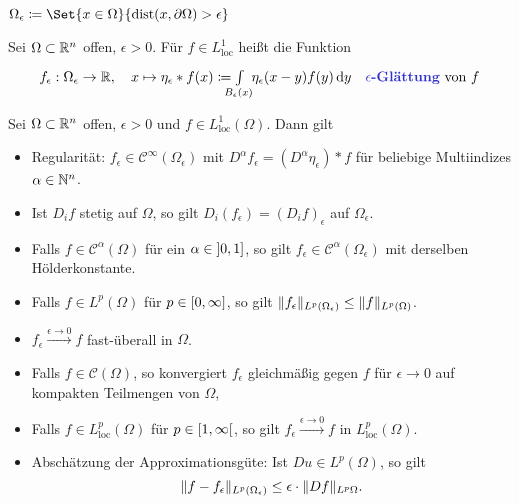\documentclass{cheat-sheet}
\newcommand{\dist}{\mathrm{dist}} %
\begin{document}
\begin{nota}
  $\Omega_{\epsilon} \coloneqq \Set{ x \in \Omega }{ \dist(x, \partial \Omega) > \epsilon }$
\end{nota}

\begin{defn}
  Sei $\Omega \subset \mathbb{R}^n$ offen, $\epsilon > 0$. Für $f \in L_{\text{loc}}^1$ heißt die Funktion
  \[
    f_\epsilon : \Omega_{\epsilon} \to \R, \quad
    x \mapsto \eta_\epsilon * f(x) \coloneqq \Int{\mathclap{B_{\epsilon}(x)}}{}{\enspace\eta_{\epsilon}(x-y) f(y)}{y}
    \quad \text{\emph{$\epsilon$-Glättung} von $f$}
  \]
\end{defn}

\begin{satz}
  Sei $\Omega \subset \mathbb{R}^n$ offen, $\epsilon > 0$ und $f \in L_{\text{loc}}^1(\Omega)$. Dann gilt
  \begin{itemize}
    \item Regularität: $f_{\epsilon} \in \mathcal{C}^\infty(\Omega_\epsilon)$ mit $D^{\alpha} f_\epsilon = (D^\alpha \eta_\epsilon) * f$ für beliebige Multiindizes $\alpha \in \mathbb{N}^n$.
    \item Ist $D_i f$ stetig auf $\Omega$, so gilt $D_i (f_\epsilon) = (D_i f)_\epsilon$ auf $\Omega_\epsilon$. %
    \item Falls $f \in \mathcal{C}^\alpha(\Omega)$ für ein $\alpha \in \left] 0, 1 \right]$, so gilt $f_\epsilon \in \mathcal{C}^\alpha(\Omega_\epsilon)$ mit derselben Hölderkonstante.
    \item Falls $f \in L^p(\Omega)$ für $p \in \left[ 0, \infty \right]$, so gilt $\lVert f_\epsilon\rVert_{L^p(\Omega_\epsilon)} \leq \lVert f\rVert_{L^p(\Omega)}$.
    \item $f_\epsilon \xrightarrow{\epsilon \to 0} f$ fast-überall in $\Omega$.
    \item Falls $f \in \mathcal{C}(\Omega)$, so konvergiert $f_\epsilon$ gleichmäßig gegen $f$ für $\epsilon \to 0$ auf kompakten Teilmengen von $\Omega$,
    \item Falls $f \in L_{\text{loc}}^p(\Omega)$ für $p \in \left[ 1, \infty \right[$, so gilt $f_\epsilon \xrightarrow{\epsilon \to 0} f$ in $L_{\text{loc}}^p(\Omega)$.
    \item Abschätzung der Approximationsgüte: Ist $Du \in L^p(\Omega)$, so gilt
    \[ \lVert f - f_\epsilon\rVert_{L^p(\Omega_\epsilon)} \leq \epsilon \cdot \lVert Df\rVert_{L^p{\Omega}}. \]
  \end{itemize}
\end{satz}
\end{document}
